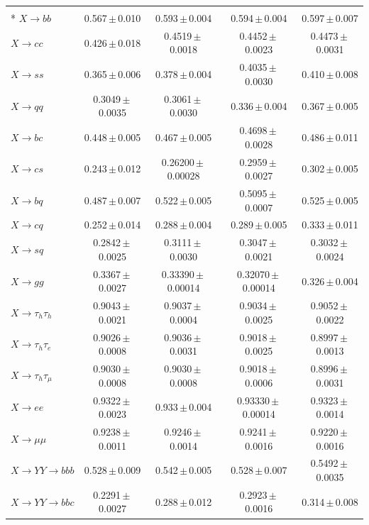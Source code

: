 \begin{landscape}
{\begin{longtable}{@{\extracolsep{\fill}}lcccc@{}}
\midrule
\endhead
\bottomrule
\endlastfoot
\multicolumn{5}{@{}l}{\textit{linear probe on the frozen features}} \\*
$X\to bb$ & 0.567\,$\pm$\,0.010 & 0.593\,$\pm$\,0.004 & 0.594\,$\pm$\,0.004 & 0.597\,$\pm$\,0.007 \\
$X\to cc$ & 0.426\,$\pm$\,0.018 & 0.4519\,$\pm$\,0.0018 & 0.4452\,$\pm$\,0.0023 & 0.4473\,$\pm$\,0.0031 \\
$X\to ss$ & 0.365\,$\pm$\,0.006 & 0.378\,$\pm$\,0.004 & 0.4035\,$\pm$\,0.0030 & 0.410\,$\pm$\,0.008 \\
$X\to qq$ & 0.3049\,$\pm$\,0.0035 & 0.3061\,$\pm$\,0.0030 & 0.336\,$\pm$\,0.004 & 0.367\,$\pm$\,0.005 \\
$X\to bc$ & 0.448\,$\pm$\,0.005 & 0.467\,$\pm$\,0.005 & 0.4698\,$\pm$\,0.0028 & 0.486\,$\pm$\,0.011 \\
$X\to cs$ & 0.243\,$\pm$\,0.012 & 0.26200\,$\pm$\,0.00028 & 0.2959\,$\pm$\,0.0027 & 0.302\,$\pm$\,0.005 \\
$X\to bq$ & 0.487\,$\pm$\,0.007 & 0.522\,$\pm$\,0.005 & 0.5095\,$\pm$\,0.0007 & 0.525\,$\pm$\,0.005 \\
$X\to cq$ & 0.252\,$\pm$\,0.014 & 0.288\,$\pm$\,0.004 & 0.289\,$\pm$\,0.005 & 0.333\,$\pm$\,0.011 \\
$X\to sq$ & 0.2842\,$\pm$\,0.0025 & 0.3111\,$\pm$\,0.0030 & 0.3047\,$\pm$\,0.0021 & 0.3032\,$\pm$\,0.0024 \\
$X\to gg$ & 0.3367\,$\pm$\,0.0027 & 0.33390\,$\pm$\,0.00014 & 0.32070\,$\pm$\,0.00014 & 0.326\,$\pm$\,0.004 \\
\midrule
$X\to \tau_h\tau_h$ & 0.9043\,$\pm$\,0.0021 & 0.9037\,$\pm$\,0.0004 & 0.9034\,$\pm$\,0.0025 & 0.9052\,$\pm$\,0.0022 \\
\midrule
$X\to \tau_h\tau_e$ & 0.9026\,$\pm$\,0.0008 & 0.9036\,$\pm$\,0.0031 & 0.9018\,$\pm$\,0.0025 & 0.8997\,$\pm$\,0.0013 \\
$X\to \tau_h\tau_\mu$ & 0.9030\,$\pm$\,0.0008 & 0.9030\,$\pm$\,0.0008 & 0.9018\,$\pm$\,0.0006 & 0.8996\,$\pm$\,0.0031 \\
\midrule
$X\to ee$ & 0.9322\,$\pm$\,0.0023 & 0.933\,$\pm$\,0.004 & 0.93330\,$\pm$\,0.00014 & 0.9323\,$\pm$\,0.0014 \\
$X\to \mu\mu$ & 0.9238\,$\pm$\,0.0011 & 0.9246\,$\pm$\,0.0014 & 0.9241\,$\pm$\,0.0016 & 0.9220\,$\pm$\,0.0016 \\
\midrule
$X\to YY\to bbb$ & 0.528\,$\pm$\,0.009 & 0.542\,$\pm$\,0.005 & 0.528\,$\pm$\,0.007 & 0.5492\,$\pm$\,0.0035 \\
$X\to YY\to bbc$ & 0.2291\,$\pm$\,0.0027 & 0.288\,$\pm$\,0.012 & 0.2923\,$\pm$\,0.0016 & 0.314\,$\pm$\,0.008 \\

\end{longtable}}
\end{landscape}
